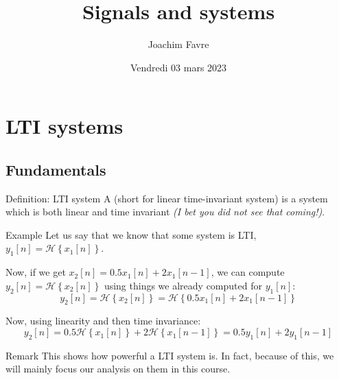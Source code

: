 \documentclass[a4paper]{article}
\title{Signals and systems}
\author{Joachim Favre}
\date{Vendredi 03 mars 2023}
\begin{document}
\maketitle


\section{LTI systems}
\subsection{Fundamentals}

\begin{parag}{Definition: LTI system}
    A  (short for linear time-invariant system) is a system which is both linear and time invariant \textit{(I bet you did not see that coming!)}.
\end{parag}

\begin{parag}{Example}
    Let us say that we know that some system is LTI, $y_1\left[n\right] = \mathcal{H}\left\{x_1\left[n\right]\right\}$. 

    Now, if we get $x_2\left[n\right] = 0.5x_1\left[n\right] + 2x_1\left[n-1\right]$, we can compute $y_2\left[n\right] = \mathcal{H}\left\{x_2\left[n\right]\right\}$ using things we already computed for $y_1\left[n\right]$: 
    \[y_2\left[n\right] = \mathcal{H}\left\{x_2\left[n\right]\right\} = \mathcal{H}\left\{0.5 x_1\left[n\right] + 2x_1\left[n-1\right]\right\}\]

    Now, using linearity and then time invariance: 
    \[y_2\left[n\right] = 0.5 \mathcal{H}\left\{x_1\left[n\right]\right\} + 2 \mathcal{H}\left\{x_1\left[n-1\right]\right\} = 0.5 y_1\left[n\right] + 2 y_1 \left[n-1\right]\]
    

    \begin{subparag}{Remark}
        This shows how powerful a LTI system is. In fact, because of this, we will mainly focus our analysis on them in this course. 
    \end{subparag}
\end{parag}
\end{document}
